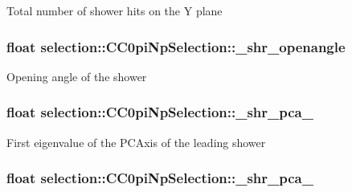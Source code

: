 Total number of shower hits on the Y plane \hypertarget{classselection_1_1CC0piNpSelection_a33b26acb3cdb05cb1b81800d8af48a03}{
\subsubsection[{\-\_\-shr\-\_\-openangle}]{\setlength{\rightskip}{0pt plus 5cm}float selection\-::\-C\-C0pi\-Np\-Selection\-::\-\_\-shr\-\_\-openangle\hspace{0.3cm}{\ttfamily [private]}}}\label{classselection_1_1CC0piNpSelection_a33b26acb3cdb05cb1b81800d8af48a03}
Opening angle of the shower \hypertarget{classselection_1_1CC0piNpSelection_a47b08d4ae98f51032f431873321914a5}{
\subsubsection[{\-\_\-shr\-\_\-pca\-\_\-0}]{\setlength{\rightskip}{0pt plus 5cm}float selection\-::\-C\-C0pi\-Np\-Selection\-::\-\_\-shr\-\_\-pca\-\_\hspace{0.3cm}{\ttfamily [private]}}}\label{classselection_1_1CC0piNpSelection_a47b08d4ae98f51032f431873321914a5}
First eigenvalue of the P\-C\-Axis of the leading shower \hypertarget{classselection_1_1CC0piNpSelection_ae3ce85b9e7002cfac57e433ee131868d}{
\subsubsection[{\-\_\-shr\-\_\-pca\-\_\-1}]{\setlength{\rightskip}{0pt plus 5cm}float selection\-::\-C\-C0pi\-Np\-Selection\-::\-\_\-shr\-\_\-pca\-\_\hspace{0.3cm}{\ttfamily [private]}}}\label{classselection_1_1CC0piNpSelection_ae3ce85b9e7002cfac57e433ee131868d}
